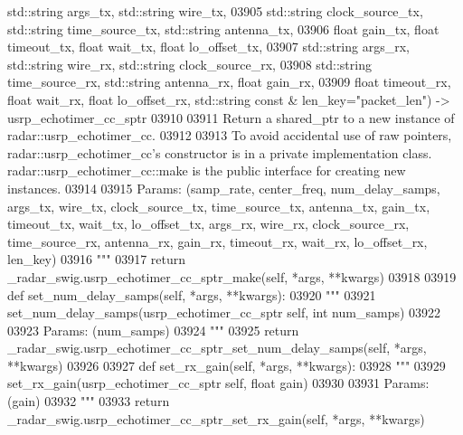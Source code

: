 \begin{DoxyCode}
{{{{{{{{{{{{{{{       std::string args\_tx, std::string wire\_tx, }
03905 \textcolor{stringliteral}{            std::string clock\_source\_tx, std::string time\_source\_tx, std::string antenna\_tx, }
03906 \textcolor{stringliteral}{            float gain\_tx, float timeout\_tx, float wait\_tx, float lo\_offset\_tx, }
03907 \textcolor{stringliteral}{            std::string args\_rx, std::string wire\_rx, std::string clock\_source\_rx, }
03908 \textcolor{stringliteral}{            std::string time\_source\_rx, std::string antenna\_rx, float gain\_rx, }
03909 \textcolor{stringliteral}{            float timeout\_rx, float wait\_rx, float lo\_offset\_rx, std::string const & len\_key="packet\_len")
       -> usrp\_echotimer\_cc\_sptr}
03910 \textcolor{stringliteral}{}
03911 \textcolor{stringliteral}{        Return a shared\_ptr to a new instance of radar::usrp\_echotimer\_cc.}
03912 \textcolor{stringliteral}{}
03913 \textcolor{stringliteral}{        To avoid accidental use of raw pointers, radar::usrp\_echotimer\_cc's constructor is in a private
       implementation class. radar::usrp\_echotimer\_cc::make is the public interface for creating new instances.}
03914 \textcolor{stringliteral}{}
03915 \textcolor{stringliteral}{        Params: (samp\_rate, center\_freq, num\_delay\_samps, args\_tx, wire\_tx, clock\_source\_tx,
       time\_source\_tx, antenna\_tx, gain\_tx, timeout\_tx, wait\_tx, lo\_offset\_tx, args\_rx, wire\_rx, clock\_source\_rx, time\_source\_rx,
       antenna\_rx, gain\_rx, timeout\_rx, wait\_rx, lo\_offset\_rx, len\_key)}
03916 \textcolor{stringliteral}{        """}
03917         \textcolor{keywordflow}{return} \_radar\_swig.usrp\_echotimer\_cc\_sptr\_make(self, *args, **kwargs)
03918 
03919     \textcolor{keyword}{def }set_num_delay_samps(self, *args, **kwargs):
03920         \textcolor{stringliteral}{"""}
03921 \textcolor{stringliteral}{        set\_num\_delay\_samps(usrp\_echotimer\_cc\_sptr self, int num\_samps)}
03922 \textcolor{stringliteral}{}
03923 \textcolor{stringliteral}{        Params: (num\_samps)}
03924 \textcolor{stringliteral}{        """}
03925         \textcolor{keywordflow}{return} \_radar\_swig.usrp\_echotimer\_cc\_sptr\_set\_num\_delay\_samps(self, *args, **kwargs)
03926 
03927     \textcolor{keyword}{def }set_rx_gain(self, *args, **kwargs):
03928         \textcolor{stringliteral}{"""}
03929 \textcolor{stringliteral}{        set\_rx\_gain(usrp\_echotimer\_cc\_sptr self, float gain)}
03930 \textcolor{stringliteral}{}
03931 \textcolor{stringliteral}{        Params: (gain)}
03932 \textcolor{stringliteral}{        """}
03933         \textcolor{keywordflow}{return} \_radar\_swig.usrp\_echotimer\_cc\_sptr\_set\_rx\_gain(self, *args, **kwargs)
}}}}}}}}}}}}}}
\end{DoxyCode}
